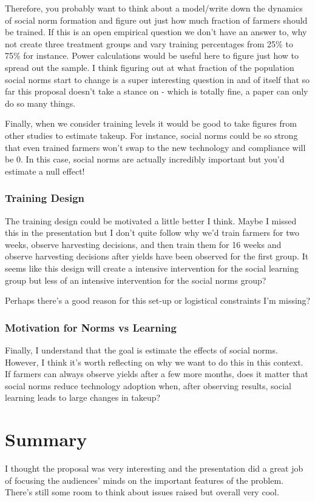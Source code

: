 \documentclass{article}
\begin{document}
Therefore, you probably want to think about a model/write down the dynamics of
social norm formation and figure out just how much fraction of farmers should 
be trained. If this is an open empirical question we don't have an answer to, 
why not create three treatment groups and vary training percentages from 25\% to 
75\% for instance. Power calculations would be useful here to figure just how 
to spread out the sample. I think figuring out at what fraction of the population 
social norms start to change is a super interesting question in and of itself 
that so far this proposal doesn't take a stance on - which is totally fine, a 
paper can only do so many things.



Finally, when we consider training levels it would be good to take figures from 
other studies to estimate takeup. For instance, social norms could be so strong 
that even trained farmers won't swap to the new technology and compliance will be 0. In this 
case, social norms are actually incredibly important but you'd estimate a null 
effect!




\subsubsection*{Training Design}

The training design could be motivated a little better I think. Maybe I missed 
this in the presentation but I don't quite follow why we'd train farmers for two 
weeks, observe harvesting decisions, and then train them for 16 weeks and observe 
harvesting decisions after yields have been observed for the first group. It 
seems like this design will create a intensive intervention for the social 
learning group but less of an intensive intervention for the social norms 
group?


Perhaps there's a good reason for this set-up or logistical constraints I'm missing?



\subsubsection*{Motivation for Norms vs Learning}
Finally, I understand that the goal is estimate the effects of social norms. However,
I think it's worth reflecting on why we want to do this in this context. If farmers 
can always observe yields after a few more months, does it matter that social norms
reduce technology adoption when, after observing results, social learning leads to 
large changes in takeup?

   
\section*{Summary}


I thought the proposal was very interesting and the presentation did a great job 
of focusing the audiences' minds on the important features of the problem. There's 
still some room to think about issues raised but overall very cool. 
\end{document}
